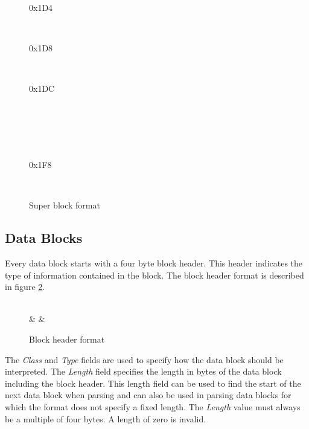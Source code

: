 \begin{figure}[h]
\begin{bytefield}[leftcurly=.,leftcurlyspace=0pt,bitwidth=0.03\linewidth]{32}
		 \\
		\skippedwords \\
		 \\

		\begin{leftwordgroup}{0x1D4}
		\end{leftwordgroup} \\
		\begin{leftwordgroup}{0x1D8}
		\end{leftwordgroup} \\
		\begin{leftwordgroup}{0x1DC}
		\end{leftwordgroup} \\

		 \\
		 \\
		 \\

		\begin{leftwordgroup}{0x1F8}
		\end{leftwordgroup} \\
	\end{bytefield}
	\caption{Super block format}
	\label{format:superblock}
\end{figure}

\subsection{Data Blocks}

Every data block starts with a four byte block header. This header indicates the type of information contained in the
block. The block header format is described in figure \ref{format:block-header}.

\begin{figure}[h]
	\centering
	\begin{bytefield}[bitwidth=0.03\linewidth]{32}
		 \\
		 &
		 &
	\end{bytefield}
	\caption{Block header format}
	\label{format:block-header}
\end{figure}

The \emph{Class} and \emph{Type} fields are used to specify how the data block should be interpreted. The \emph{Length}
field specifies the length in bytes of the data block including the block header. This length field can be used to find
the start of the next data block when parsing and can also be used in parsing data blocks for which the format does not
specify a fixed length. The \emph{Length} value must always be a multiple of four bytes. A length of zero is invalid.

